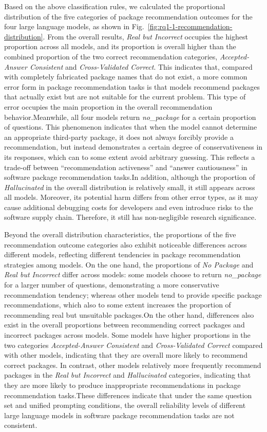 Based on the above classification rules, we calculated the proportional distribution of the five categories of package recommendation outcomes for the four large 
language models, as shown in Fig.~\ref{fig:rq1-1-recommendation-distribution}. From the overall results, \textit{Real but Incorrect} occupies the highest proportion 
across all models, and its proportion is overall higher than the combined proportion of the two correct recommendation categories, \textit{Accepted-Answer Consistent} 
and \textit{Cross-Validated Correct}. This indicates that, compared with completely fabricated package names that do not exist, a more common error form in package 
recommendation tasks is that models recommend packages that actually exist but are not suitable for the current problem. This type of error occupies the main 
proportion in the overall recommendation behavior.Meanwhile, all four models return \textit{no\_package} for a certain proportion of questions. This phenomenon 
indicates that when the model cannot determine an appropriate third-party package, it does not always forcibly provide a recommendation, but instead demonstrates a 
certain degree of conservativeness in its responses, which can to some extent avoid arbitrary guessing. This reflects a trade-off between ``recommendation 
activeness'' and ``answer cautiousness'' in software package recommendation tasks.In addition, although the proportion of \textit{Hallucinated} in the overall 
distribution is relatively small, it still appears across all models. Moreover, its potential harm differs from other error types, as it may cause additional 
debugging costs for developers and even introduce risks to the software supply chain. Therefore, it still has non-negligible research significance.

Beyond the overall distribution characteristics, the proportions of the five recommendation outcome categories also exhibit noticeable differences across different 
models, reflecting different tendencies in package recommendation strategies among models. On the one hand, the proportions of \textit{No Package} 
and \textit{Real but Incorrect} differ across models: some models choose to return \textit{no\_package} for a larger number of questions, demonstrating a more 
conservative recommendation tendency; whereas other models tend to provide specific package recommendations, which also to some extent increases the proportion 
of recommending real but unsuitable packages.On the other hand, differences also exist in the overall proportions between recommending correct packages and 
incorrect packages across models. Some models have higher proportions in the two categories \textit{Accepted-Answer Consistent} and \textit{Cross-Validated Correct} 
compared with other models, indicating that they are overall more likely to recommend correct packages. In contrast, other models relatively more frequently 
recommend packages in the \textit{Real but Incorrect} and \textit{Hallucinated} categories, indicating that they are more likely to produce inappropriate 
recommendations in package recommendation tasks.These differences indicate that under the same question set and unified prompting conditions, the overall 
reliability levels of different large language models in software package recommendation tasks are not consistent.

